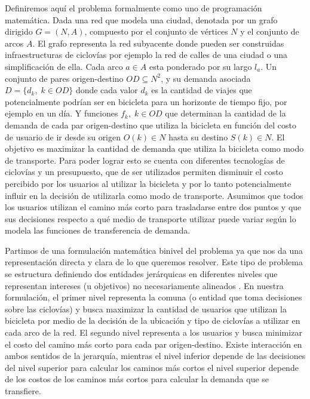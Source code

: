 \documentclass{article}
\begin{document}
  Definiremos aquí el problema formalmente como uno de programación matemática. Dada una red que modela una ciudad, denotada por un grafo dirigido $G=(N,A)$, compuesto por el conjunto de vértices $N$ y el conjunto de arcos $A$. El grafo representa la red subyacente donde pueden ser construidas infraestructuras de ciclovías por ejemplo la red de calles de una ciudad o una simplificación de ella. Cada arco $a \in A$ esta ponderado por su largo $l_a$. Un conjunto de pares origen-destino $OD \subseteq N^2$, y su demanda asociada $D = \{d_k,\; k \in OD\}$ donde cada valor $d_k$ es la cantidad de viajes que potencialmente podrían ser en bicicleta para un horizonte de tiempo fijo, por ejemplo en un día. Y funciones $f_k,\;k \in OD$ que determinan la cantidad de la demanda de cada par origen-destino que utiliza la bicicleta en función del costo de usuario de ir desde su origen $O(k) \in N$ hasta su destino $S(k) \in N$. El objetivo es maximizar la cantidad de demanda que utiliza la bicicleta como modo de transporte. Para poder lograr esto se cuenta con diferentes tecnologías de ciclovías y un presupuesto, que de ser utilizados permiten disminuir el costo percibido por los usuarios al utilizar la bicicleta y por lo tanto potencialmente influir en la decisión de utilizarla como modo de transporte. Asumimos que todos los usuarios utilizan el camino más corto para trasladarse entre dos puntos y que sus decisiones respecto a qué medio de transporte utilizar puede variar según lo modela las funciones de transferencia de demanda.

  Partimos de una formulación matemática binivel del problema ya que nos da una representación directa y clara de lo que queremos resolver. Este tipo de problema se estructura definiendo dos entidades jerárquicas en diferentes niveles que representan intereses (u objetivos) no necesariamente alineados \cite{bardbook}. En nuestra formulación, el primer nivel representa la comuna (o entidad que toma decisiones sobre las ciclovías) y busca maximizar la cantidad de usuarios que utilizan la bicicleta por medio de la decisión de la ubicación y tipo de ciclovías a utilizar en cada arco de la red. El segundo nivel representa a los usuarios y busca minimizar el costo del camino más corto para cada par origen-destino. Existe interacción en ambos sentidos de la jerarquía, mientras el nivel inferior depende de las decisiones del nivel superior para calcular los caminos más cortos el nivel superior depende de los costos de los caminos más cortos para calcular la demanda que se transfiere.
\end{document}
